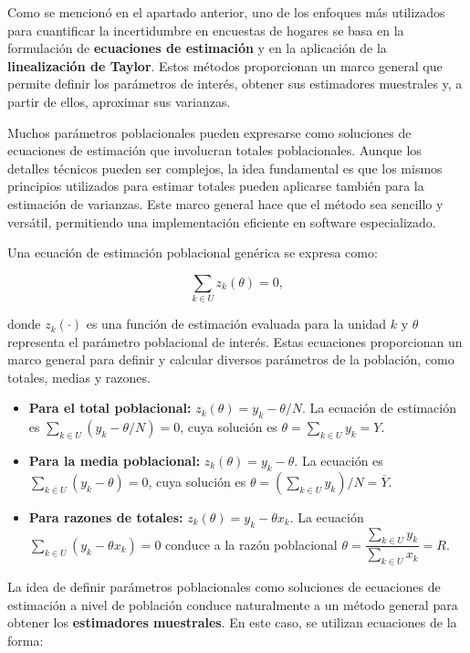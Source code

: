 \documentclass[
  spanish,
  12pt,
]{book}
\begin{document}
Como se mencionó en el apartado anterior, uno de los enfoques más utilizados para cuantificar la incertidumbre en encuestas de hogares se basa en la formulación de \textbf{ecuaciones de estimación} y en la aplicación de la \textbf{linealización de Taylor}. Estos métodos proporcionan un marco general que permite definir los parámetros de interés, obtener sus estimadores muestrales y, a partir de ellos, aproximar sus varianzas.

Muchos parámetros poblacionales pueden expresarse como soluciones de ecuaciones de estimación que involucran totales poblacionales. Aunque los detalles técnicos pueden ser complejos, la idea fundamental es que los mismos principios utilizados para estimar totales pueden aplicarse también para la estimación de varianzas. Este marco general hace que el método sea sencillo y versátil, permitiendo una implementación eficiente en software especializado.

Una ecuación de estimación poblacional genérica se expresa como:

\[
\sum_{k\in U} z_k(\theta)=0,
\]

donde \(z_k(\cdot)\) es una función de estimación evaluada para la unidad \(k\) y \(\theta\) representa el parámetro poblacional de interés. Estas ecuaciones proporcionan un marco general para definir y calcular diversos parámetros de la población, como totales, medias y razones.

\begin{itemize}
\item
  \textbf{Para el total poblacional:}
  \(z_k(\theta)=y_k-\theta/N\). La ecuación de estimación es \(\sum_{k\in U}(y_k-\theta/N)=0\), cuya solución es \(\theta=\sum_{k\in U} y_k = Y\).
\item
  \textbf{Para la media poblacional:}
  \(z_k(\theta)=y_k-\theta\). La ecuación es \(\sum_{k\in U}(y_k-\theta)=0\), cuya solución es \(\theta=\left(\sum_{k\in U} y_k\right)/N = \overline{Y}\).
\item
  \textbf{Para razones de totales:}
  \(z_k(\theta)=y_k-\theta x_k\). La ecuación \(\sum_{k\in U}(y_k-\theta x_k)=0\) conduce a la razón poblacional \(\theta=\dfrac{\sum_{k\in U} y_k}{\sum_{k\in U} x_k} = R\).
\end{itemize}

La idea de definir parámetros poblacionales como soluciones de ecuaciones de estimación a nivel de población conduce naturalmente a un método general para obtener los \textbf{estimadores muestrales}. En este caso, se utilizan ecuaciones de la forma:
\end{document}
